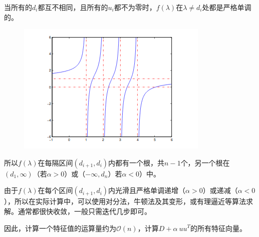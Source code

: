 \documentclass[12pt,a4paper]{article}
\begin{document}
当所有的$d_i$都互不相同，且所有的$u_i$都不为零时，$f(\lambda)$在$\lambda \neq d_i$处都是严格单调的。
\begin{figure}[H]
	\centering
	\includegraphics[scale=1]{./figures/figure_2.png}
\end{figure}
所以$f(\lambda)$在每隔区间$(d_{i+1},d_i)$内都有一个根，共$n-1$个，另一个根在$(d_1,\infty)$（若$\alpha >0$）或（$-\infty,d_n$）若$\alpha <0$）中。

由于$f(\lambda)$在每个区间$(d_{i+1},d_i)$内光滑且严格单调递增（$\alpha >0$）或递减（$\alpha <0$），所以在实际计算中，可以使用对分法，牛顿法及其变形，或有理逼近等算法求解。通常都很快收敛，一般只需迭代几步即可。

因此，计算一个特征值的运算量约为$\mathcal{O}(n)$，计算$D+\alpha\ uu^T$的所有特征向量。
\end{document}

